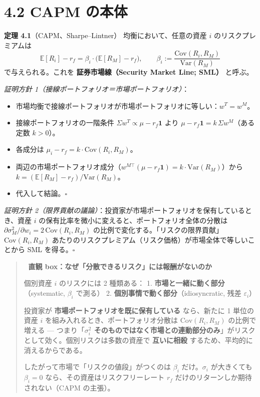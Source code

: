 \documentclass[11pt,a4paper]{report}
\begin{document}
\section{4.2 CAPM の本体}

\textbf{定理 4.1}（CAPM、Sharpe–Lintner） 均衡において、任意の資産 $i$ のリスクプレミアムは \[ \boxed{\; \mathbb{E}[R_i] - r_f = \beta_i \cdot \big(\mathbb{E}[R_M] - r_f\big),\qquad \beta_i := \frac{\mathrm{Cov}(R_i, R_M)}{\mathrm{Var}(R_M)} \;} \] で与えられる。これを \textbf{証券市場線（Security Market Line; SML）} と呼ぶ。

\emph{証明方針 1（接線ポートフォリオ＝市場ポートフォリオ）}：
\begin{itemize}
\item 市場均衡で接線ポートフォリオが市場ポートフォリオに等しい：$w^T = w^M$。
\item 接線ポートフォリオの一階条件 $\Sigma w^T \propto \mu - r_f\mathbf{1}$ より $\mu - r_f \mathbf{1} = k\, \Sigma w^M$（ある定数 $k>0$）。
\item 各成分は $\mu_i - r_f = k \cdot \mathrm{Cov}(R_i, R_M)$。
\item 両辺の市場ポートフォリオ成分（$w^{M\top}(\mu - r_f\mathbf{1}) = k \cdot \mathrm{Var}(R_M)$）から $k = (\mathbb{E}[R_M] - r_f)/\mathrm{Var}(R_M)$。
\item 代入して結論。$\square$
\end{itemize}

\emph{証明方針 2（限界貢献の議論）}：投資家が市場ポートフォリオを保有しているとき、資産 $i$ の保有比率を微小に変えると、ポートフォリオ全体の分散は $\partial \sigma_M^2 / \partial w_i = 2\, \mathrm{Cov}(R_i, R_M)$ の比例で変化する。「リスクの限界貢献」 $\mathrm{Cov}(R_i, R_M)$ あたりのリスクプレミアム（リスク価格）が市場全体で等しいことから SML を得る。$\square$

\begin{quote}
🎯 \textbf{直観 box：なぜ「分散できるリスク」には報酬がないのか}

個別資産 $i$ のリスクには 2 種類ある：
1. \textbf{市場と一緒に動く部分}（systematic, $\beta_i$ で測る）
2. \textbf{個別事情で動く部分}（idiosyncratic, 残差 $\varepsilon_i$）

投資家が \textbf{市場ポートフォリオを既に保有している} なら、新たに 1 単位の資産 $i$ を組み入れるとき、ポートフォリオ分散は $\mathrm{Cov}(R_i, R_M)$ の比例で増える — つまり「\textbf{$\sigma_i^2$ そのものではなく市場との連動部分のみ}」がリスクとして効く。個別リスクは多数の資産で \textbf{互いに相殺} するため、平均的に消えるからである。

したがって市場で「リスクの値段」がつくのは $\beta_i$ だけ。$\sigma_i$ が大きくても $\beta_i = 0$ なら、その資産はリスクフリーレート $r_f$ だけのリターンしか期待されない（CAPM の主張）。
\end{quote}
\end{document}
